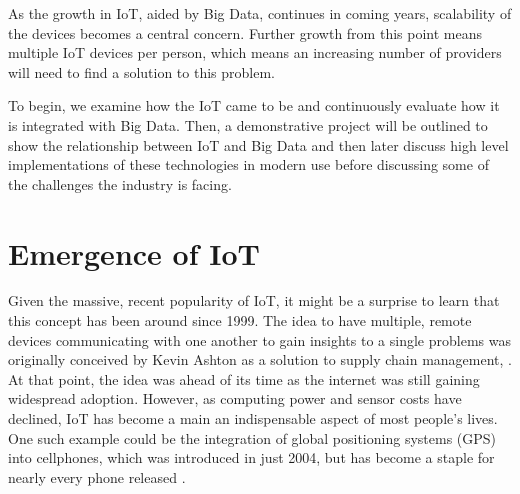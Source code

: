 \documentclass[sigconf]{acmart}
\begin{document}
As the growth in IoT, aided by Big Data, continues in coming years, scalability of the devices becomes a central concern. Further growth from this point means multiple IoT devices per person, which means an increasing number of providers will need to find a solution to this problem. 

To begin, we examine how the IoT came to be and continuously evaluate how it is integrated with Big Data. Then, a demonstrative project will be outlined to show the relationship between IoT and Big Data and then later discuss high level implementations of these technologies in modern use before discussing some of the challenges the industry is facing. 
\section{Emergence of IoT}
Given the massive, recent popularity of IoT, it might be a surprise to learn that this concept has been around since 1999. The idea to have multiple, remote devices communicating with one another to gain insights to a single problems was originally conceived by Kevin Ashton as a solution to supply chain management, \cite{ashton}. At that point, the idea was ahead of its time as the internet was still gaining widespread adoption. However, as computing power and sensor costs have declined, IoT has become a main an indispensable aspect of most people's lives. One such example could be the integration of global positioning systems (GPS) into cellphones, which was introduced in just 2004, but has become a staple for nearly every phone released \cite{gps}.  
\end{document}
